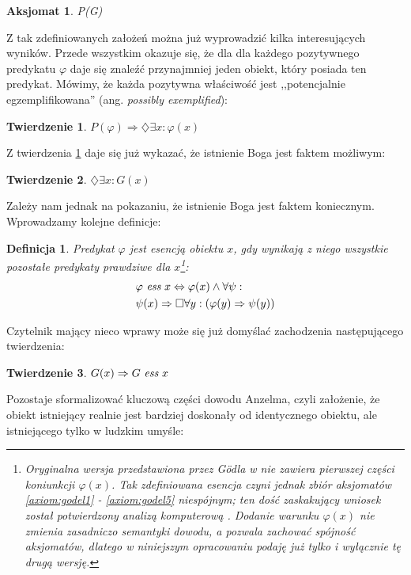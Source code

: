\documentclass[
	runningheads
]{llncs}
\newtheorem{theorem-pl}{Twierdzenie}
\newtheorem{definition-pl}{Definicja}
\newtheorem{axiom-pl}{Aksjomat}
\begin{document}
\begin{axiom-pl} \label{axiom:godel4}
	P(G)
\end{axiom-pl}
\noindent Z tak zdefiniowanych założeń można już wyprowadzić kilka interesujących wyników. Przede wszystkim okazuje się, że dla dla każdego pozytywnego predykatu $\varphi$ daje się znaleźć przynajmniej jeden obiekt, który posiada ten predykat. Mówimy, że każda pozytywna właściwość jest ,,potencjalnie egzemplifikowana'' (ang. \emph{possibly exemplified}):
\begin{theorem-pl} \label{th:godel1}
	$P(\varphi) \Rightarrow \diamondsuit \exists x: \varphi(x)$
\end{theorem-pl}
\noindent Z twierdzenia \ref{th:godel1} daje się już wykazać, że istnienie Boga jest faktem możliwym:
\begin{theorem-pl} \label{th:godel2}
	$\diamondsuit \exists x: G(x)$
\end{theorem-pl}
\noindent Zależy nam jednak na pokazaniu, że istnienie Boga jest faktem koniecznym. Wprowadzamy kolejne definicje:
\begin{definition-pl} \label{def:godel-essence}
	Predykat $\varphi$ jest \emph{esencją} obiektu $x$, gdy wynikają z niego wszystkie pozostałe predykaty prawdziwe dla $x$\footnote{Oryginalna wersja przedstawiona przez G\"odla w \cite{goedel2004} nie zawiera pierwszej części koniunkcji $\varphi(x)$. Tak zdefiniowana esencja czyni jednak zbiór aksjomatów \ref{axiom:godel1} - \ref{axiom:godel5} niespójnym; ten dość zaskakujący wniosek został potwierdzony analizą komputerową \cite{benzmuller2014}. Dodanie warunku $\varphi(x)$ nie zmienia zasadniczo semantyki dowodu, a pozwala zachować spójność aksjomatów, dlatego w niniejszym opracowaniu podaję już tylko i wyłącznie tę drugą wersję.}:
	\begin{align*}
	& \varphi\ \emph{ess}\ x \Leftrightarrow \varphi(x) \wedge \forall \psi: \\ 
	& \psi(x) \Rightarrow \Box \forall y: \left( \varphi(y) \Rightarrow \psi(y) \right)
	\end{align*}
\end{definition-pl}
\noindent Czytelnik mający nieco wprawy może się już domyślać zachodzenia następującego twierdzenia:
\begin{theorem-pl} \label{th:godel3}
	$G(x) \Rightarrow G\ \emph{ess}\ x$
\end{theorem-pl}
\noindent Pozostaje sformalizować kluczową części dowodu Anzelma, czyli założenie, że obiekt istniejący realnie jest bardziej doskonały od identycznego obiektu, ale istniejącego tylko w ludzkim umyśle: 
\end{document}
